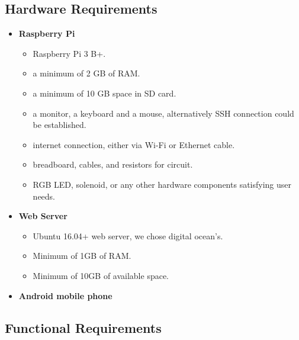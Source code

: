 \documentclass[12pt, oneside, a4paper]{book}
\newcommand\boldcolor[1]{\textcolor{bold}{\textbf{#1}}}
\begin{document}
			\newpage\subsection{Hardware Requirements}
				\begin{itemize}
					\item \boldcolor{Raspberry Pi} 
					\begin{itemize}
						\item Raspberry Pi 3 B+.
						\item a minimum of 2 GB of RAM.
						\item a minimum of 10 GB space in SD card.
						\item a monitor, a keyboard and a mouse, alternatively SSH connection could be established.
						\item internet connection, either via Wi-Fi or Ethernet cable.
						\item breadboard, cables, and resistors for circuit.
						\item RGB LED, solenoid, or any other hardware components satisfying user needs.
					\end{itemize}
					\item \boldcolor{Web Server} 
					\begin{itemize}
						\item Ubuntu 16.04+ web server, we chose digital ocean's.
						\item Minimum of 1GB of RAM.
						\item Minimum of 10GB of available space.
					\end{itemize}
					\item \boldcolor{Android mobile phone} 
				\end{itemize}
			\newpage\subsection{Functional Requirements}
			\renewcommand{\labelenumii}{\theenumii}
			\renewcommand{\theenumii}{\theenumi.\arabic{enumii}.}
\end{document}

